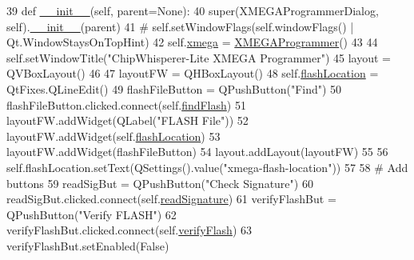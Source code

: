 \begin{DoxyCode}
39     \textcolor{keyword}{def }\hyperlink{classsoftware_1_1chipwhisperer_1_1capture_1_1utils_1_1XMEGAProgrammer_1_1XMEGAProgrammerDialog_adb519b57e3d8449b5418e1e070aa06f9}{\_\_init\_\_}(self, parent=None):
40         super(XMEGAProgrammerDialog, self).\hyperlink{classsoftware_1_1chipwhisperer_1_1capture_1_1utils_1_1XMEGAProgrammer_1_1XMEGAProgrammerDialog_adb519b57e3d8449b5418e1e070aa06f9}{\_\_init\_\_}(parent)
41         \textcolor{comment}{# self.setWindowFlags(self.windowFlags() | Qt.WindowStaysOnTopHint)}
42         self.\hyperlink{classsoftware_1_1chipwhisperer_1_1capture_1_1utils_1_1XMEGAProgrammer_1_1XMEGAProgrammerDialog_a7d77907b27fbf5c33fa1b65ffb844ebb}{xmega} = \hyperlink{classsoftware_1_1chipwhisperer_1_1capture_1_1utils_1_1XMEGAProgrammer_1_1XMEGAProgrammer}{XMEGAProgrammer}()
43 
44         self.setWindowTitle(\textcolor{stringliteral}{"ChipWhisperer-Lite XMEGA Programmer"})
45         layout = QVBoxLayout()
46 
47         layoutFW = QHBoxLayout()
48         self.\hyperlink{classsoftware_1_1chipwhisperer_1_1capture_1_1utils_1_1XMEGAProgrammer_1_1XMEGAProgrammerDialog_ade2a4972c2c1ad75c75b75940936612f}{flashLocation} = QtFixes.QLineEdit()
49         flashFileButton = QPushButton(\textcolor{stringliteral}{"Find"})
50         flashFileButton.clicked.connect(self.\hyperlink{classsoftware_1_1chipwhisperer_1_1capture_1_1utils_1_1XMEGAProgrammer_1_1XMEGAProgrammerDialog_a80830ebd5f64857a1e272d4423be8dbf}{findFlash})
51         layoutFW.addWidget(QLabel(\textcolor{stringliteral}{"FLASH File"}))
52         layoutFW.addWidget(self.\hyperlink{classsoftware_1_1chipwhisperer_1_1capture_1_1utils_1_1XMEGAProgrammer_1_1XMEGAProgrammerDialog_ade2a4972c2c1ad75c75b75940936612f}{flashLocation})
53         layoutFW.addWidget(flashFileButton)
54         layout.addLayout(layoutFW)
55 
56         self.flashLocation.setText(QSettings().value(\textcolor{stringliteral}{"xmega-flash-location"}))
57 
58         \textcolor{comment}{# Add buttons}
59         readSigBut = QPushButton(\textcolor{stringliteral}{"Check Signature"})
60         readSigBut.clicked.connect(self.\hyperlink{classsoftware_1_1chipwhisperer_1_1capture_1_1utils_1_1XMEGAProgrammer_1_1XMEGAProgrammerDialog_a44e9c93dde92824c90ca35e768a3df93}{readSignature})
61         verifyFlashBut = QPushButton(\textcolor{stringliteral}{"Verify FLASH"})
62         verifyFlashBut.clicked.connect(self.\hyperlink{classsoftware_1_1chipwhisperer_1_1capture_1_1utils_1_1XMEGAProgrammer_1_1XMEGAProgrammerDialog_a8a3aa82e780539611a4e4af44f2d5903}{verifyFlash})
63         verifyFlashBut.setEnabled(\textcolor{keyword}{False})

\end{DoxyCode}
